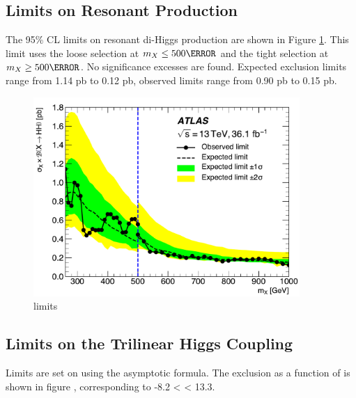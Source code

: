 \subsection{Limits on Resonant Production}

The 95\% \gls{CL} limits on resonant di-Higgs production are shown in Figure \ref{fig:limits-resonant}. This limit uses the loose selection at $m_{X} \leq \unit{500}{\GeV}$ and the tight selection at $m_{X} \geq \unit{500}{\GeV}$. No significance excesses are found. Expected exclusion limits range from 1.14 pb to 0.12 pb, observed limits range from 0.90 pb to 0.15 pb.

\begin{figure}[htbp]
  \centering
\includegraphics[width=0.9\textwidth]{chapters/chapter5_yybb/images/limits/resonant.pdf}
  \caption{limits}
  \label{fig:limits-resonant}
\end{figure}

\subsection{Limits on the Trilinear Higgs Coupling}

Limits are set on \klambda using the asymptotic formula. The exclusion as a function of \klambda is shown in figure , corresponding to -8.2 < \klambda < 13.3.

